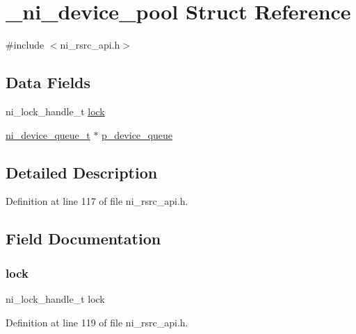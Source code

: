 \hypertarget{struct__ni__device__pool}{}\section{\+\_\+ni\+\_\+device\+\_\+pool Struct Reference}
\label{struct__ni__device__pool}


{\ttfamily \#include $<$ni\+\_\+rsrc\+\_\+api.\+h$>$}

\subsection*{Data Fields}
\begin{DoxyCompactItemize}
\item 
ni\+\_\+lock\+\_\+handle\+\_\+t \mbox{\hyperlink{struct__ni__device__pool_ad70c9254e2a51831bfd8b769d977a6a9}{lock}}
\item 
\mbox{\hyperlink{ni__rsrc__api_8h_a9d2ed9ccf29349d91855dc9db68b3597}{ni\+\_\+device\+\_\+queue\+\_\+t}} $\ast$ \mbox{\hyperlink{struct__ni__device__pool_a13f13b4129de1f549238ddba449c6398}{p\+\_\+device\+\_\+queue}}
\end{DoxyCompactItemize}


\subsection{Detailed Description}


Definition at line 117 of file ni\+\_\+rsrc\+\_\+api.\+h.



\subsection{Field Documentation}
\mbox{\label{struct__ni__device__pool_ad70c9254e2a51831bfd8b769d977a6a9}} 
\subsubsection{\texorpdfstring{lock}{lock}}
{\footnotesize\ttfamily ni\+\_\+lock\+\_\+handle\+\_\+t lock}



Definition at line 119 of file ni\+\_\+rsrc\+\_\+api.\+h.

\mbox{\label{struct__ni__device__pool_a13f13b4129de1f549238ddba449c6398}} 
